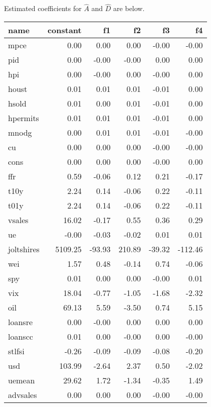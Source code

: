 \documentclass[11pt, letterpaper]{article}\usepackage[]{graphicx}\usepackage[]{color}
\begin{document}
Estimated coefficients for $\widehat{A}$ and $\widehat{D}$ are below.
\begin{table}[H]
\centering
\begingroup\footnotesize
\begin{tabular}{lrrrrr}
  \hline
name & constant & f1 & f2 & f3 & f4 \\ 
  \hline
mpce & 0.00 & 0.00 & 0.00 & -0.00 & -0.00 \\ 
  pid & 0.00 & -0.00 & -0.00 & 0.00 & 0.00 \\ 
  hpi & 0.00 & -0.00 & 0.00 & -0.00 & 0.00 \\ 
  houst & 0.01 & 0.01 & 0.01 & -0.01 & 0.00 \\ 
  hsold & 0.01 & 0.00 & 0.01 & -0.01 & 0.00 \\ 
  hpermits & 0.01 & 0.01 & 0.01 & -0.01 & 0.00 \\ 
  mnodg & 0.00 & 0.01 & 0.01 & -0.01 & -0.00 \\ 
  cu & 0.00 & 0.00 & 0.00 & -0.00 & -0.00 \\ 
  cons & 0.00 & 0.00 & 0.00 & -0.00 & 0.00 \\ 
  ffr & 0.59 & -0.06 & 0.12 & 0.21 & -0.17 \\ 
  t10y & 2.24 & 0.14 & -0.06 & 0.22 & -0.11 \\ 
  t01y & 2.24 & 0.14 & -0.06 & 0.22 & -0.11 \\ 
  vsales & 16.02 & -0.17 & 0.55 & 0.36 & 0.29 \\ 
  ue & -0.00 & -0.03 & -0.02 & 0.01 & 0.01 \\ 
  joltshires & 5109.25 & -93.93 & 210.89 & -39.32 & -112.46 \\ 
  wei & 1.57 & 0.48 & -0.14 & 0.74 & -0.06 \\ 
  spy & 0.01 & 0.00 & 0.00 & -0.00 & 0.01 \\ 
  vix & 18.04 & -0.77 & -1.05 & -1.68 & -2.32 \\ 
  oil & 69.13 & 5.59 & -3.50 & 0.74 & 5.15 \\ 
  loansre & 0.00 & -0.00 & 0.00 & 0.00 & 0.00 \\ 
  loanscc & 0.01 & 0.00 & -0.00 & 0.00 & -0.00 \\ 
  stlfsi & -0.26 & -0.09 & -0.09 & -0.08 & -0.20 \\ 
  usd & 103.99 & -2.64 & 2.37 & 0.50 & -2.02 \\ 
  uemean & 29.62 & 1.72 & -1.34 & -0.35 & 1.49 \\ 
  advsales & 0.00 & 0.00 & 0.00 & -0.00 & -0.00 \\ 

\end{tabular}
\end{table}
\end{document}
